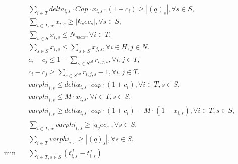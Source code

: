 \begin{align}
  & \sum_{i \in {T}} \mathit{delta}_{i , s} \cdot \mathit{Cap} \cdot x_{i , s} \cdot \left(1 + c_{i}\right) \geq \left|\left({q}\right)_{s}\right| , \forall s \in S , \tag{eq\_0027} \\
  & \sum_{i \in T_vec} x_{i , s} \geq \left|k_vec_{s}\right| , \forall s \in S , \tag{eq\_0028} \\
  & \sum_{s \in S} x_{i , s} \leq N_{\mathit{max}} , \forall i \in T . \tag{eq\_0029} \\
  & \sum_{s \in S} x_{i , s} \leq \sum_{s \in S} x_{j , s} , \forall i \in H , j \in N . \tag{eq\_0030} \\
  & c_{i} - c_{j} \leq 1 - \underset{s \in S^{\mathit{od}}}{\sum} r_{i , j , s} , \forall i , j \in T , \tag{eq\_0031} \\
  & c_{i} - c_{j} \geq \underset{s \in S^{\mathit{od}}}{\sum} r_{i , j , s} - 1 , \forall i , j \in T . \tag{eq\_0032} \\
  & \mathit{varphi}_{i , s} \leq \mathit{delta}_{i , s} \cdot \mathit{cap} \cdot \left(1 + c_{i}\right) , \forall i \in T , s \in S , \tag{eq\_0033} \\
  & \mathit{varphi}_{i , s} \leq M \cdot x_{i , s} , \forall i \in T , s \in S , \tag{eq\_0034} \\
  & \mathit{varphi}_{i , s} \geq \mathit{delta}_{i , s} \cdot \mathit{cap} \cdot \left(1 + c_{i}\right) - M \cdot \left(1 - x_{i , s}\right) , \forall i \in T , s \in S , \tag{eq\_0035} \\
  & \sum_{i \in T_vec} \mathit{varphi}_{i , s} \geq \left|q_vec_{s}\right| , \forall s \in S , \tag{eq\_0036} \\
  & \sum_{i \in {T}} \mathit{varphi}_{i , s} \geq \left|\left({q}\right)_{s}\right| , \forall s \in S . \tag{eq\_0037} \\
  \min\quad & \sum_{i \in T, s \in S} \left(t_{i , s}^{d} - t_{i , s}^{a}\right) \tag{eq\_0038} \\
\end{align}
